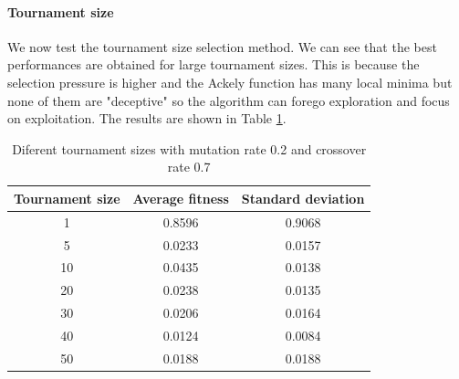 \paragraph*{Tournament size}
We now test the tournament size selection method. We can see that the best performances are obtained for large tournament sizes. This is because the selection pressure is higher and the Ackely function has many local minima but none of them are "deceptive" so the algorithm can forego exploration and focus on exploitation. The results are shown in Table \ref{tab:tournament_size}.
\begin{table}
    \centering
    \begin{tabular}{|c|c|c|}
        Tournament size & Average fitness & Standard deviation \\ \hline
        1               & 0.8596          & 0.9068             \\
        5               & 0.0233          & 0.0157             \\
        10              & 0.0435          & 0.0138             \\
        20              & 0.0238          & 0.0135             \\
        30              & 0.0206          & 0.0164             \\
        40              & 0.0124          & 0.0084             \\
        50              & 0.0188          & 0.0188             \\
    \end{tabular}
    \caption{Diferent tournament sizes with mutation rate 0.2 and crossover rate 0.7}
    \label{tab:tournament_size}
\end{table}

